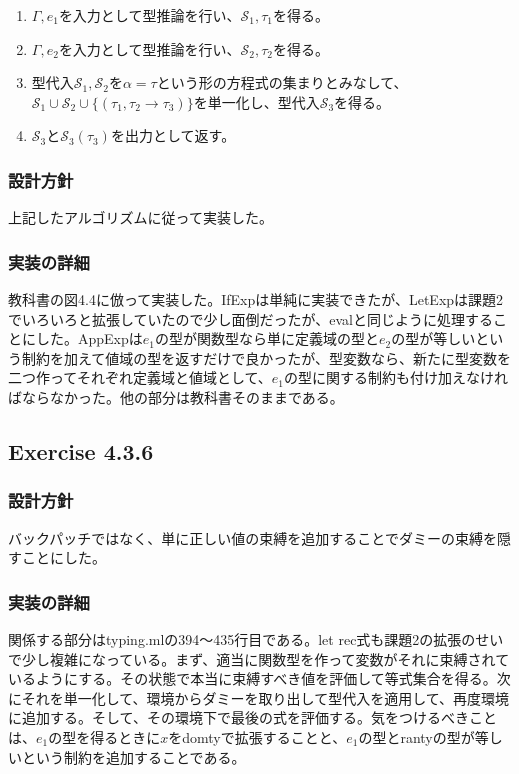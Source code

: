 \documentclass{jarticle}
\begin{document}
\begin{description}
  \begin{enumerate}
  \item $\Gamma,e_{1}$を入力として型推論を行い、$\mathcal{S}_{1},\tau_{1}$を得る。
  \item $\Gamma,e_{2}$を入力として型推論を行い、$\mathcal{S}_{2},\tau_{2}$を得る。
  \item 型代入$\mathcal{S}_{1},\mathcal{S}_{2}$を$\alpha=\tau$という形の方程式の集まりとみなして、$\mathcal{S}_{1} \cup \mathcal{S}_{2} \cup \{(\tau_{1},\tau_{2} \rightarrow \tau_{3})\}$を単一化し、型代入$\mathcal{S}_{3}$を得る。
  \item $\mathcal{S}_{3}$と$\mathcal{S}_{3}(\tau_{3})$を出力として返す。
  \end{enumerate}
\end{description}
\subsubsection{設計方針}
上記したアルゴリズムに従って実装した。
\subsubsection{実装の詳細}
教科書の図4.4に倣って実装した。IfExpは単純に実装できたが、LetExpは課題2でいろいろと拡張していたので少し面倒だったが、evalと同じように処理することにした。AppExpは$e_{1}$の型が関数型なら単に定義域の型と$e_{2}$の型が等しいという制約を加えて値域の型を返すだけで良かったが、型変数なら、新たに型変数を二つ作ってそれぞれ定義域と値域として、$e_{1}$の型に関する制約も付け加えなければならなかった。他の部分は教科書そのままである。

\subsection{Exercise 4.3.6}
\subsubsection{設計方針}
バックパッチではなく、単に正しい値の束縛を追加することでダミーの束縛を隠すことにした。
\subsubsection{実装の詳細}
関係する部分はtyping.mlの394〜435行目である。let rec式も課題2の拡張のせいで少し複雑になっている。まず、適当に関数型を作って変数がそれに束縛されているようにする。その状態で本当に束縛すべき値を評価して等式集合を得る。次にそれを単一化して、環境からダミーを取り出して型代入を適用して、再度環境に追加する。そして、その環境下で最後の式を評価する。気をつけるべきことは、$e_{1}$の型を得るときに$x$をdomtyで拡張することと、$e_{1}$の型とrantyの型が等しいという制約を追加することである。
\end{document}
